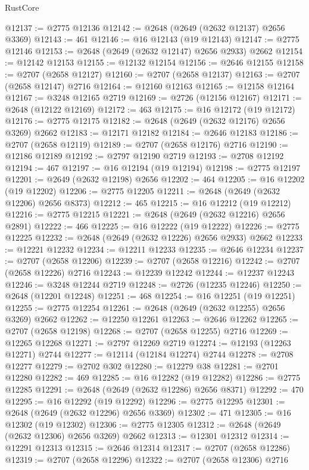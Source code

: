 \begin{lexlean}{RustCore}
\begin{coremodule}
@12137 := @2775 @12136
@12142 := @2648 (@2649 (@2632 @12137) @2656 @3369)
@12143 := 461
@12146 := @16 @12143 (@19 @12143)
@12147 := @2775 @12146
@12153 := @2648 (@2649 (@2632 @12147) @2656 @2933) @2662
@12154 := @12142 @12153
@12155 := @12132 @12154
@12156 := @2646 @12155
@12158 := @2707 (@2658 @12127)
@12160 := @2707 (@2658 @12137)
@12163 := @2707 (@2658 @12147) @2716
@12164 := @12160 @12163
@12165 := @12158 @12164
@12167 := @3248 @12165 @2719
@12169 := @2726 (@12156 @12167)
@12171 := @2648 (@12122 @12169)
@12172 := 463
@12175 := @16 @12172 (@19 @12172)
@12176 := @2775 @12175
@12182 := @2648 (@2649 (@2632 @12176) @2656 @3269) @2662
@12183 := @12171 @12182
@12184 := @2646 @12183
@12186 := @2707 (@2658 @12119)
@12189 := @2707 (@2658 @12176) @2716
@12190 := @12186 @12189
@12192 := @2797 @12190 @2719
@12193 := @2708 @12192
@12194 := 467
@12197 := @16 @12194 (@19 @12194)
@12198 := @2775 @12197
@12201 := @2649 (@2632 @12198) @2656
@12202 := 464
@12205 := @16 @12202 (@19 @12202)
@12206 := @2775 @12205
@12211 := @2648 (@2649 (@2632 @12206) @2656 @8373)
@12212 := 465
@12215 := @16 @12212 (@19 @12212)
@12216 := @2775 @12215
@12221 := @2648 (@2649 (@2632 @12216) @2656 @2891)
@12222 := 466
@12225 := @16 @12222 (@19 @12222)
@12226 := @2775 @12225
@12232 := @2648 (@2649 (@2632 @12226) @2656 @2933) @2662
@12233 := @12221 @12232
@12234 := @12211 @12233
@12235 := @2646 @12234
@12237 := @2707 (@2658 @12206)
@12239 := @2707 (@2658 @12216)
@12242 := @2707 (@2658 @12226) @2716
@12243 := @12239 @12242
@12244 := @12237 @12243
@12246 := @3248 @12244 @2719
@12248 := @2726 (@12235 @12246)
@12250 := @2648 (@12201 @12248)
@12251 := 468
@12254 := @16 @12251 (@19 @12251)
@12255 := @2775 @12254
@12261 := @2648 (@2649 (@2632 @12255) @2656 @3269) @2662
@12262 := @12250 @12261
@12263 := @2646 @12262
@12265 := @2707 (@2658 @12198)
@12268 := @2707 (@2658 @12255) @2716
@12269 := @12265 @12268
@12271 := @2797 @12269 @2719
@12274 := @12193 (@12263 @12271) @2744
@12277 := @12114 (@12184 @12274) @2744
@12278 := @2708 @12277
@12279 := @2702 @302
@12280 := @12279 @38
@12281 := @2701 @12280
@12282 := 469
@12285 := @16 @12282 (@19 @12282)
@12286 := @2775 @12285
@12291 := @2648 (@2649 (@2632 @12286) @2656 @8371)
@12292 := 470
@12295 := @16 @12292 (@19 @12292)
@12296 := @2775 @12295
@12301 := @2648 (@2649 (@2632 @12296) @2656 @3369)
@12302 := 471
@12305 := @16 @12302 (@19 @12302)
@12306 := @2775 @12305
@12312 := @2648 (@2649 (@2632 @12306) @2656 @3269) @2662
@12313 := @12301 @12312
@12314 := @12291 @12313
@12315 := @2646 @12314
@12317 := @2707 (@2658 @12286)
@12319 := @2707 (@2658 @12296)
@12322 := @2707 (@2658 @12306) @2716

\end{coremodule}
\end{lexlean}
